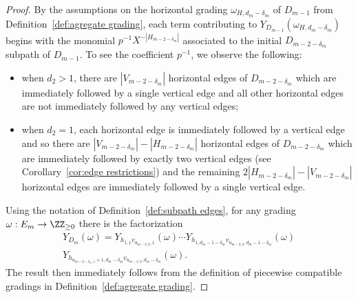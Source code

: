 \begin{proof}
 By the assumptions on the horizontal grading $\omega_{H,d_m-\delta_m}$ of $D_{m-1}$ from Definition~\ref{def:agregate grading}, each term contributing to $Y_{D_{m-1}}(\omega_{H,d_m-\delta_m})$ begins with the monomial $p^{-1}X^{-|H_{m-2-\delta_m}|}$ associated to the initial $D_{m-2-\delta_m}$ subpath of $D_{m-1}$. 
 To see the coefficient $p^{-1}$, we observe the following:
 \begin{itemize}
 \item when $d_2>1$, there are $|V_{m-2-\delta_m}|$ horizontal edges of $D_{m-2-\delta_m}$ which are immediately followed by a single vertical edge and all other horizontal edges are not immediately followed by any vertical edges;
 \item when $d_2=1$, each horizontal edge is immediately followed by a vertical edge and so there are $|V_{m-2-\delta_m}|-|H_{m-2-\delta_m}|$ horizontal edges of $D_{m-2-\delta_m}$ which are immediately followed by exactly two vertical edges (see Corollary~\ref{cor:edge restrictions}) and the remaining $2|H_{m-2-\delta_m}|-|V_{m-2-\delta_m}|$ horizontal edges are immediately followed by a single vertical edge.
 \end{itemize}

 Using the notation of Definition~\ref{def:subpath edges}, for any grading $\omega:E_m\to\ZZ_{\ge0}$ there is the factorization
 \begin{multline*}
 Y_{D_m}(\omega)=Y_{h_{1,1}v_{u_{m-2,2},1}}(\omega)\cdots Y_{h_{1,d_m-1-\delta_m}v_{u_{m-2,2},d_m-1-\delta_m}}(\omega)\\
 Y_{h_{u_{m-2-\delta_m,1}+1,d_m-\delta_m}v_{u_{m-2,2},d_m-\delta_m}}(\omega).
 \end{multline*}
 The result then immediately follows from the definition of piecewise compatible gradings in Definition~\ref{def:agregate grading}.
\end{proof}

